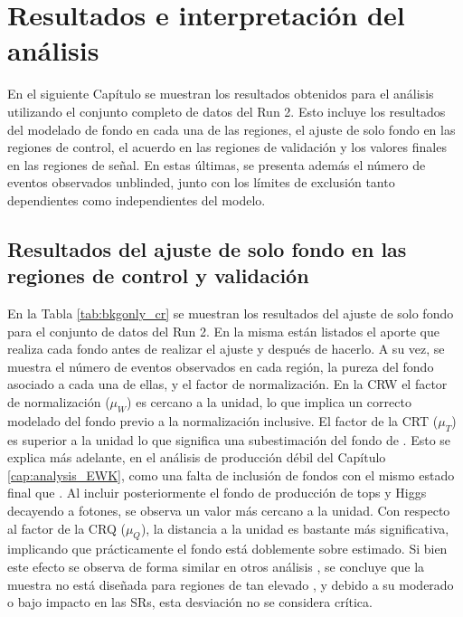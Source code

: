 \chapter{Resultados e interpretación del análisis}

En el siguiente Capítulo se muestran los resultados obtenidos para el análisis utilizando el conjunto completo de datos del Run 2. Esto incluye los resultados del modelado de fondo en cada una de las regiones, el ajuste de solo fondo en las regiones de control, el acuerdo en las regiones de validación y los valores finales en las regiones de señal. En estas últimas, se presenta además el número de eventos observados unblinded, junto con los límites de exclusión tanto dependientes como independientes del modelo. 

\section{Resultados del ajuste de solo fondo en las regiones de control y validación}


En la Tabla \ref{tab:bkgonly_cr} se muestran los resultados del ajuste de solo fondo para el conjunto de datos del Run 2. En la misma están listados el aporte que realiza cada fondo antes de realizar el ajuste y después de hacerlo. A su vez, se muestra el número de eventos observados en cada región, la pureza del fondo asociado a cada una de ellas, y el factor de normalización. 
En la CRW el factor de normalización ($\mu_W$) es cercano a la unidad, lo que implica un correcto modelado del fondo previo a la normalización inclusive. El factor de la CRT ($\mu_T$) es superior a la unidad lo que significa una subestimación del fondo de \ttbarph. Esto se explica más adelante, en el análisis de producción débil del Capítulo \ref{cap:analysis_EWK}, como una falta de inclusión de fondos con el mismo estado final que \ttbarph. Al incluir posteriormente el fondo de producción de tops y Higgs decayendo a fotones, se observa un valor más cercano a la unidad. Con respecto al factor de la CRQ ($\mu_Q$), la distancia a la unidad es bastante más significativa, implicando que prácticamente el fondo está doblemente sobre estimado. Si bien este efecto se observa de forma similar en otros análisis \cite{Alonso:2689095} 
, se concluye que la muestra no está diseñada para regiones de tan elevado \met, y debido a su moderado o bajo impacto en las SRs, esta desviación no se considera crítica. 

